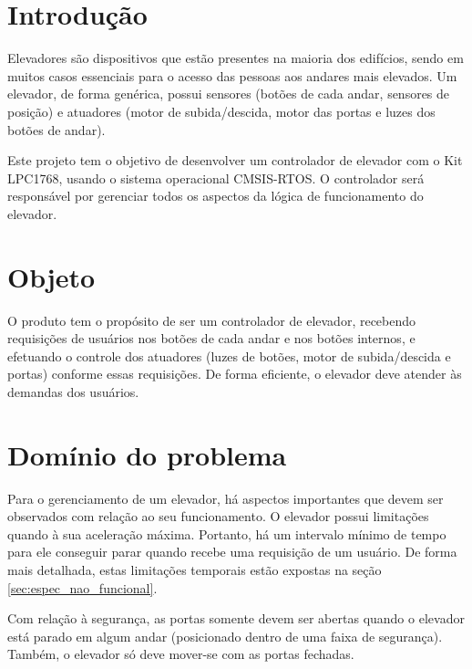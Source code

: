 
\section{Introdução}
Elevadores são dispositivos que estão presentes na maioria dos edifícios, sendo em muitos casos essenciais para o acesso das pessoas aos andares mais elevados. Um elevador, de forma genérica, possui sensores (botões de cada andar, sensores de posição) e atuadores (motor de subida/descida, motor das portas e luzes dos botões de andar).

Este projeto tem o objetivo de desenvolver um controlador de elevador com o Kit LPC1768, usando o sistema operacional CMSIS-RTOS. O controlador será responsável por gerenciar todos os aspectos da lógica de funcionamento do elevador.

\section{Objeto}
O produto tem o propósito de ser um controlador de elevador, recebendo requisições de usuários nos botões de cada andar e nos botões internos, e efetuando o controle dos atuadores (luzes de botões, motor de subida/descida e portas) conforme essas requisições. De forma eficiente, o elevador deve atender às demandas dos usuários.

\section{Domínio do problema}

Para o gerenciamento de um elevador, há aspectos importantes que devem ser observados com relação ao seu funcionamento.  O elevador possui limitações quando à sua aceleração máxima. Portanto, há um intervalo mínimo de tempo para ele conseguir parar quando recebe uma requisição de um usuário. De forma mais detalhada, estas limitações temporais estão expostas na seção \ref{sec:espec_nao_funcional}.

Com relação à segurança, as portas somente devem ser abertas quando o elevador está parado em algum andar (posicionado dentro de uma faixa de segurança). Também, o elevador só deve mover-se com as portas fechadas.



